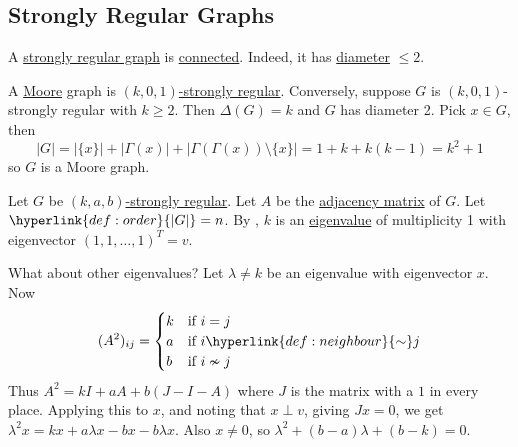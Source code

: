 \documentclass{article}
\begin{document}
\subsection{Strongly Regular Graphs}
\begin{remark}
    A \hyperlink{def:sr}{strongly regular graph} is \hyperlink{def:components}{connected}. Indeed, it has \hyperlink{def:diameter}{diameter} $\leq 2$.
\end{remark}
A \hyperlink{def:moore}{Moore} graph is \hyperlink{def:sr}{$(k,0,1)$-strongly regular}.
Conversely, suppose $G$ is $(k,0,1)$-strongly regular with $k \geq 2$. Then $\Delta(G) = k$ and $G$ has diameter 2.
Pick $x \in G$, then
\begin{equation*}
    |G| = |\{x\}| + |\Gamma(x)| + |\Gamma(\Gamma(x)) \setminus \{x\}| = 1 + k + k(k-1) = k^2 + 1
\end{equation*}
so $G$ is a Moore graph.

Let $G$ be \hyperlink{def:sr}{$(k,a,b)$-strongly regular}.
Let $A$ be the \hyperlink{def:adj}{adjacency matrix} of $G$.
Let $\hyperlink{def:order}{|G|}=n$.
By , $k$ is an \hyperlink{def:eigen}{eigenvalue} of multiplicity 1 with eigenvector $(1,1,\dotsc,1)^T = v$.

What about other eigenvalues?
Let $\lambda \neq k$ be an eigenvalue with eigenvector $x$. Now
\begin{equation*}
    (A^2)_{ij} =
    \begin{cases}
        k & \text{if } i = j \\
        a & \text{if } i \hyperlink{def:neighbour}{\sim} j \\
        b & \text{if } i \nsim j
    \end{cases}
\end{equation*}
Thus $A^2 = k I + aA + b(J-I-A)$ where $J$ is the matrix with a $1$ in every place.
Applying this to $x$, and noting that $x \perp v$, giving $J x = 0$, we get $\lambda^2 x = k x + a \lambda x - b x - b \lambda x$.
Also $x \neq 0$, so $\lambda^2 + (b-a) \lambda + (b-k) = 0$.
\end{document}
